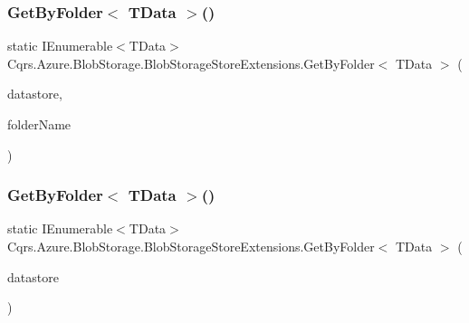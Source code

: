 \subsubsection{\texorpdfstring{Get\+By\+Folder$<$ T\+Data $>$()}{GetByFolder< TData >()}\hspace{0.1cm}{\footnotesize\ttfamily [1/2]}}
{\footnotesize\ttfamily static I\+Enumerable$<$T\+Data$>$ Cqrs.\+Azure.\+Blob\+Storage.\+Blob\+Storage\+Store\+Extensions.\+Get\+By\+Folder$<$ T\+Data $>$ (\begin{DoxyParamCaption}\item[{this \hyperlink{interfaceCqrs_1_1DataStores_1_1IDataStore}{I\+Data\+Store}$<$ T\+Data $>$}]{datastore,  }\item[{string}]{folder\+Name }\end{DoxyParamCaption})\hspace{0.3cm}{\ttfamily [static]}}

\mbox{\label{classCqrs_1_1Azure_1_1BlobStorage_1_1BlobStorageStoreExtensions_a71348a56844b38342f7d9e6d979fa3f6}} 
\subsubsection{\texorpdfstring{Get\+By\+Folder$<$ T\+Data $>$()}{GetByFolder< TData >()}\hspace{0.1cm}{\footnotesize\ttfamily [2/2]}}
{\footnotesize\ttfamily static I\+Enumerable$<$T\+Data$>$ Cqrs.\+Azure.\+Blob\+Storage.\+Blob\+Storage\+Store\+Extensions.\+Get\+By\+Folder$<$ T\+Data $>$ (\begin{DoxyParamCaption}\item[{this \hyperlink{interfaceCqrs_1_1DataStores_1_1IDataStore}{I\+Data\+Store}$<$ T\+Data $>$}]{datastore }\end{DoxyParamCaption})\hspace{0.3cm}{\ttfamily [static]}}

